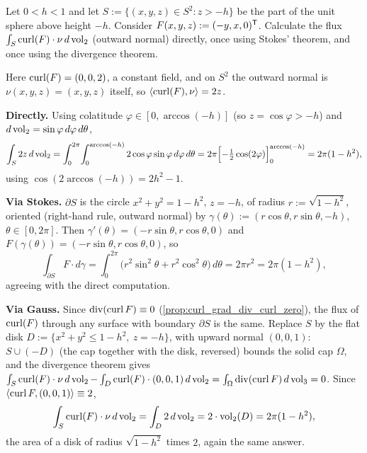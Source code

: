 \begin{exercise}
\label{ex:spherical_cap_flux_stokes_gauss}
Let $0<h<1$ and let $S := \{(x,y,z)\in S^2 : z>-h\}$ be the part of the unit sphere above
height $-h$. Consider $F(x,y,z) := (-y,x,0)^{\mathsf{T}}$. Calculate the flux
$\int_S\operatorname{curl}(F)\cdot\nu\,d\operatorname{vol}_2$ (outward normal) directly, once using Stokes' theorem, and
once using the divergence theorem.
\end{exercise}

\begin{exercisesolution}
Here $\operatorname{curl}(F) = (0,0,2)$, a constant field, and on $S^2$ the outward normal is
$\nu(x,y,z)=(x,y,z)$ itself, so $\langle\operatorname{curl}(F),\nu\rangle = 2z$.

\textbf{Directly.} Using colatitude $\varphi\in[0,\arccos(-h)]$ (so $z=\cos\varphi>-h$) and
$d\operatorname{vol}_2=\sin\varphi\,d\varphi\,d\theta$,
\[\int_S 2z\,d\operatorname{vol}_2 = \int_0^{2\pi}\!\int_0^{\arccos(-h)} 2\cos\varphi\sin\varphi\,d\varphi\,d\theta
  = 2\pi\Big[{-}\tfrac12\cos(2\varphi)\Big]_0^{\arccos(-h)} = 2\pi(1-h^2),\]
using $\cos(2\arccos(-h)) = 2h^2-1$.

\textbf{Via Stokes.} $\partial S$ is the circle $x^2+y^2=1-h^2$, $z=-h$, of radius
$r:=\sqrt{1-h^2}$, oriented (right-hand rule, outward normal) by
$\gamma(\theta) := (r\cos\theta,r\sin\theta,-h)$, $\theta\in[0,2\pi]$. Then
$\gamma'(\theta) = (-r\sin\theta,r\cos\theta,0)$ and $F(\gamma(\theta)) =
(-r\sin\theta,r\cos\theta,0)$, so
\[\int_{\partial S}F\cdot d\gamma = \int_0^{2\pi}\big(r^2\sin^2\theta+r^2\cos^2\theta\big)\,d\theta
  = 2\pi r^2 = 2\pi(1-h^2),\]
agreeing with the direct computation.

\textbf{Via Gauss.} Since $\operatorname{div}(\operatorname{curl} F)\equiv0$ (\cref{prop:curl_grad_div_curl_zero}), the flux
of $\operatorname{curl}(F)$ through any surface with boundary $\partial S$ is the same. Replace $S$ by the
flat disk $D := \{x^2+y^2\leq1-h^2,\ z=-h\}$, with upward normal $(0,0,1)$: $S\cup(-D)$
(the cap together with the disk, reversed) bounds the solid cap $\Omega$, and the divergence
theorem gives $\int_S\operatorname{curl}(F)\cdot\nu\,d\operatorname{vol}_2 - \int_D\operatorname{curl}(F)\cdot(0,0,1)\,d\operatorname{vol}_2 =
\int_\Omega\operatorname{div}(\operatorname{curl} F)\,d\operatorname{vol}_3 = 0$. Since $\langle\operatorname{curl} F,(0,0,1)\rangle\equiv2$,
\[\int_S\operatorname{curl}(F)\cdot\nu\,d\operatorname{vol}_2 = \int_D 2\,d\operatorname{vol}_2 = 2\cdot\operatorname{vol}_2(D) = 2\pi(1-h^2),\]
the area of a disk of radius $\sqrt{1-h^2}$ times $2$, again the same answer.
\end{exercisesolution}

